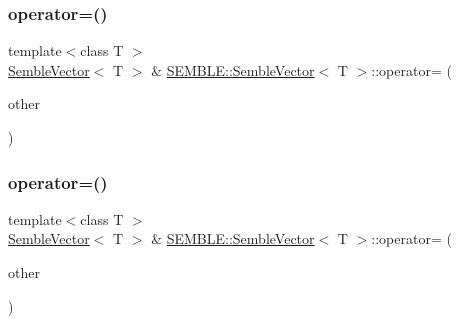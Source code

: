 \mbox{\label{structSEMBLE_1_1SembleVector_ab6872005fc4c6dae0da5832e49f15efb}} 
\subsubsection{\texorpdfstring{operator=()}{operator=()}\hspace{0.1cm}{\footnotesize\ttfamily [2/8]}}
{\footnotesize\ttfamily template$<$class T $>$ \\
\mbox{\hyperlink{structSEMBLE_1_1SembleVector}{Semble\+Vector}}$<$ T $>$ \& \mbox{\hyperlink{structSEMBLE_1_1SembleVector}{S\+E\+M\+B\+L\+E\+::\+Semble\+Vector}}$<$ T $>$\+::operator= (\begin{DoxyParamCaption}\item[{const \mbox{\hyperlink{structSEMBLE_1_1SembleVector}{Semble\+Vector}}$<$ T $>$ \&}]{other }\end{DoxyParamCaption})}

\mbox{\label{structSEMBLE_1_1SembleVector_a77509266a73ada965ab9b6a598922a75}} 
\subsubsection{\texorpdfstring{operator=()}{operator=()}\hspace{0.1cm}{\footnotesize\ttfamily [3/8]}}
{\footnotesize\ttfamily template$<$class T $>$ \\
\mbox{\hyperlink{structSEMBLE_1_1SembleVector}{Semble\+Vector}}$<$ T $>$ \& \mbox{\hyperlink{structSEMBLE_1_1SembleVector}{S\+E\+M\+B\+L\+E\+::\+Semble\+Vector}}$<$ T $>$\+::operator= (\begin{DoxyParamCaption}\item[{const typename \mbox{\hyperlink{structSEMBLE_1_1PromoteEnsemVec}{Promote\+Ensem\+Vec}}$<$ T $>$\+::Type \&}]{other }\end{DoxyParamCaption})}

